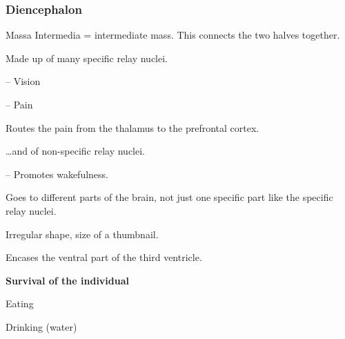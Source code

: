\subsubsection{Diencephalon}

\begin{coloredlist}
    \item {}
    \begin{coloredlist}
        \item Massa Intermedia = intermediate mass. This connects the two halves together.
        \item Made up of many specific relay nuclei.
        \begin{coloredlist}
            \item {} -- Vision
            \item {} -- Pain
            \begin{coloredlist}
                \item Routes the pain from the thalamus to the prefrontal cortex.
            \end{coloredlist}
        \end{coloredlist}
        \item \dots and of non-specific relay nuclei.
        \begin{coloredlist}
            \item {} -- Promotes wakefulness.
            \begin{coloredlist}
                \item Goes to different parts of the brain, not just one specific part like the specific relay nuclei.
            \end{coloredlist}
        \end{coloredlist}
    \end{coloredlist}
    \item {}
    \begin{coloredlist}
        \item Irregular shape, size of a thumbnail.
        \item Encases the ventral part of the third ventricle.
        \item \textbf{Survival of the individual}
        \begin{coloredlist}
            \item Eating
            \item Drinking (water)
            \begin{coloredlist}

\end{coloredlist}
\end{coloredlist}
\end{coloredlist}
\end{coloredlist}
